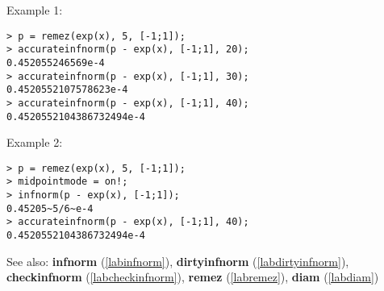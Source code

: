 \noindent Example 1: 
\begin{center}\begin{minipage}{15cm}\begin{Verbatim}[frame=single]
> p = remez(exp(x), 5, [-1;1]);
> accurateinfnorm(p - exp(x), [-1;1], 20);
0.452055246569e-4
> accurateinfnorm(p - exp(x), [-1;1], 30);
0.4520552107578623e-4
> accurateinfnorm(p - exp(x), [-1;1], 40);
0.4520552104386732494e-4
\end{Verbatim}
\end{minipage}\end{center}
\noindent Example 2: 
\begin{center}\begin{minipage}{15cm}\begin{Verbatim}[frame=single]
> p = remez(exp(x), 5, [-1;1]);
> midpointmode = on!;
> infnorm(p - exp(x), [-1;1]);
0.45205~5/6~e-4
> accurateinfnorm(p - exp(x), [-1;1], 40);
0.4520552104386732494e-4
\end{Verbatim}
\end{minipage}\end{center}
See also: \textbf{infnorm} (\ref{labinfnorm}), \textbf{dirtyinfnorm} (\ref{labdirtyinfnorm}), \textbf{checkinfnorm} (\ref{labcheckinfnorm}), \textbf{remez} (\ref{labremez}), \textbf{diam} (\ref{labdiam})

